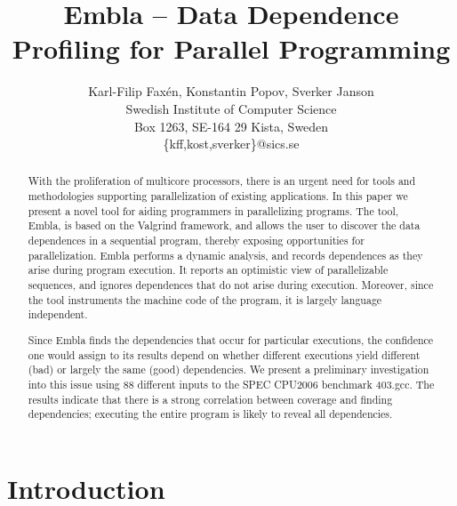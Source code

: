 \documentclass[times, 10pt,twocolumn]{article}
\begin{document}
\title{Embla -- Data Dependence Profiling for Parallel Programming }
\author{Karl-Filip Fax\'en, Konstantin Popov, Sverker Janson\\
       Swedish Institute of Computer Science\\
       Box 1263, SE-164 29 Kista, Sweden\\
       \{kff,kost,sverker\}@sics.se}
\date{}
\maketitle

\begin{abstract}

With the proliferation of multicore processors, there is an urgent need for
tools and methodologies supporting parallelization of existing
applications.  In this paper we present a novel tool for aiding
programmers in parallelizing programs. The tool, Embla, is based on the
Valgrind framework, and allows the user to
discover the data dependences in a sequential program, thereby exposing
opportunities for parallelization.  Embla performs a dynamic analysis,
and records dependences as they
arise during program execution.  It reports an optimistic view of
parallelizable sequences, and ignores dependences that do not arise during
execution.  
Moreover, since the tool instruments the machine code of the program,
it is largely language independent. 

Since Embla finds the dependencies that occur for particular
executions, the confidence one would assign to its results depend on
whether different executions yield different (bad) or largely the same
(good) dependencies. We present a preliminary investigation into this
issue using 88 different inputs to the SPEC CPU2006 benchmark 403.gcc.
The results indicate that there is a strong correlation between coverage
and finding dependencies; executing the entire program is likely to 
reveal all dependencies.
\end{abstract}


\section{Introduction}
\end{document}
